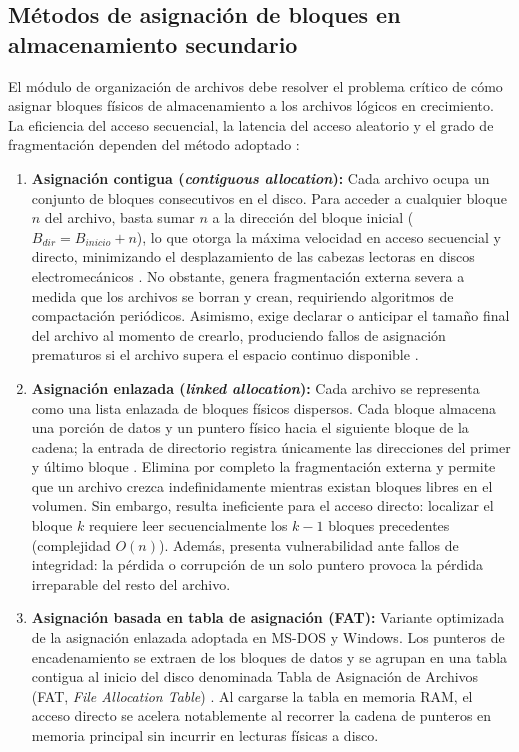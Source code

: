 \documentclass[12pt]{article}
\begin{document}
\subsection{Métodos de asignación de bloques en almacenamiento secundario}
\label{subsec:metodosAsignacionBloques}

El módulo de organización de archivos debe resolver el problema crítico de cómo asignar bloques físicos de almacenamiento a los archivos lógicos en crecimiento. La eficiencia del acceso secuencial, la latencia del acceso aleatorio y el grado de fragmentación dependen del método adoptado \parencite[\S 11.4, pp.\ 380--388]{silberschatz2006fundamentos}:

\begin{enumerate}[noitemsep, topsep=2pt]
    \item \textbf{Asignación contigua (\textit{contiguous allocation}):} Cada archivo ocupa un conjunto de bloques consecutivos en el disco. Para acceder a cualquier bloque $n$ del archivo, basta sumar $n$ a la dirección del bloque inicial ($B_{dir} = B_{inicio} + n$), lo que otorga la máxima velocidad en acceso secuencial y directo, minimizando el desplazamiento de las cabezas lectoras en discos electromecánicos \parencite[\S 11.4.1, p.\ 380]{silberschatz2006fundamentos}. No obstante, genera fragmentación externa severa a medida que los archivos se borran y crean, requiriendo algoritmos de compactación periódicos. Asimismo, exige declarar o anticipar el tamaño final del archivo al momento de crearlo, produciendo fallos de asignación prematuros si el archivo supera el espacio continuo disponible \parencite[\S 12.7, p.\ 570]{stallings2018operating}.
    \item \textbf{Asignación enlazada (\textit{linked allocation}):} Cada archivo se representa como una lista enlazada de bloques físicos dispersos. Cada bloque almacena una porción de datos y un puntero físico hacia el siguiente bloque de la cadena; la entrada de directorio registra únicamente las direcciones del primer y último bloque \parencite[\S 11.4.2, p.\ 382]{silberschatz2006fundamentos}. Elimina por completo la fragmentación externa y permite que un archivo crezca indefinidamente mientras existan bloques libres en el volumen. Sin embargo, resulta ineficiente para el acceso directo: localizar el bloque $k$ requiere leer secuencialmente los $k-1$ bloques precedentes (complejidad $O(n)$). Además, presenta vulnerabilidad ante fallos de integridad: la pérdida o corrupción de un solo puntero provoca la pérdida irreparable del resto del archivo.
    \item \textbf{Asignación basada en tabla de asignación (FAT):} Variante optimizada de la asignación enlazada adoptada en MS-DOS y Windows. Los punteros de encadenamiento se extraen de los bloques de datos y se agrupan en una tabla contigua al inicio del disco denominada Tabla de Asignación de Archivos (FAT, \textit{File Allocation Table}) \parencite[\S 11.4.2, p.\ 384]{silberschatz2006fundamentos}. Al cargarse la tabla en memoria RAM, el acceso directo se acelera notablemente al recorrer la cadena de punteros en memoria principal sin incurrir en lecturas físicas a disco.

\end{enumerate}
\end{document}
